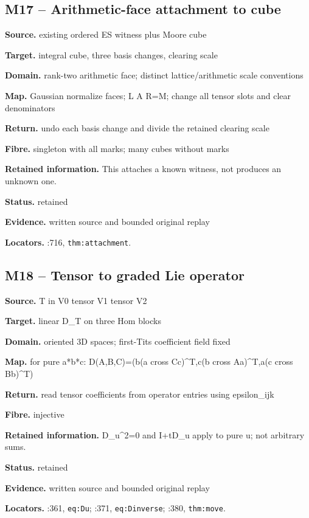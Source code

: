 \subsection*{M17 -- Arithmetic-face attachment to cube}
\noindent\textbf{Source.} existing ordered ES witness plus Moore cube\par
\noindent\textbf{Target.} integral cube, three basis changes, clearing scale\par
\noindent\textbf{Domain.} rank-two arithmetic face; distinct lattice/arithmetic scale conventions\par
\noindent\textbf{Map.} Gaussian normalize faces; L A R=M; change all tensor slots and clear denominators\par
\noindent\textbf{Return.} undo each basis change and divide the retained clearing scale\par
\noindent\textbf{Fibre.} singleton with all marks; many cubes without marks\par
\noindent\textbf{Retained information.} This attaches a known witness, not produces an unknown one.\par
\noindent\textbf{Status.} retained\par
\noindent\textbf{Evidence.} written source and bounded original replay\par
\noindent\textbf{Locators.} :716, \texttt{thm:attachment}.
\subsection*{M18 -- Tensor to graded Lie operator}
\noindent\textbf{Source.} T in V0 tensor V1 tensor V2\par
\noindent\textbf{Target.} linear D\_T on three Hom blocks\par
\noindent\textbf{Domain.} oriented 3D spaces; first-Tits coefficient field fixed\par
\noindent\textbf{Map.} for pure a*b*c: D(A,B,C)=(b(a cross Cc)\textasciicircum{}T,c(b cross Aa)\textasciicircum{}T,a(c cross Bb)\textasciicircum{}T)\par
\noindent\textbf{Return.} read tensor coefficients from operator entries using epsilon\_ijk\par
\noindent\textbf{Fibre.} injective\par
\noindent\textbf{Retained information.} D\_u\textasciicircum{}2=0 and I+tD\_u apply to pure u; not arbitrary sums.\par
\noindent\textbf{Status.} retained\par
\noindent\textbf{Evidence.} written source and bounded original replay\par
\noindent\textbf{Locators.} :361, \texttt{eq:Du}; :371, \texttt{eq:Dinverse}; :380, \texttt{thm:move}.
